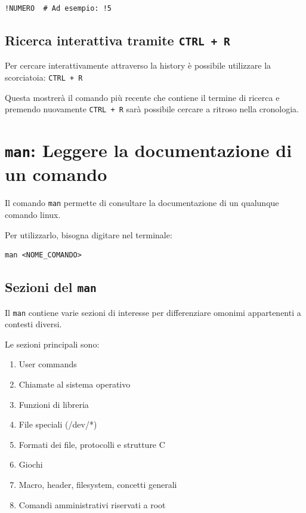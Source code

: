 \documentclass[a4paper]{report}
\newenvironment{code}{\begin{tcolorbox}[size=small]}{\end{tcolorbox}}
\begin{document}
\begin{lstlisting}
!NUMERO  # Ad esempio: !5
\end{lstlisting}

\subsection*{Ricerca interattiva tramite \texttt{CTRL + R}}
Per cercare interattivamente attraverso la history è possibile utilizzare la scorciatoia: \texttt{CTRL + R}

Questa mostrerà il comando più recente che contiene il termine di ricerca e premendo nuovamente \texttt{CTRL + R} sarà possibile cercare a ritroso nella cronologia.

\section{\texttt{man}: Leggere la documentazione di un comando}

Il comando \texttt{man} permette di consultare la documentazione di un qualunque comando linux.

Per utilizzarlo, bisogna digitare nel terminale:

\begin{code}
\begin{lstlisting}
man <NOME_COMANDO>
\end{lstlisting}
\end{code}

\subsection*{Sezioni del \texttt{man}}

Il \texttt{man} contiene varie sezioni di interesse per differenziare omonimi appartenenti a contesti diversi.

Le sezioni principali sono:

\begin{enumerate}
	\setlength{\itemsep}{0pt}
	\item User commands
	\item Chiamate al sistema operativo
	\item Funzioni di libreria
	\item File speciali (/dev/*)
	\item Formati dei file, protocolli e strutture C
	\item Giochi
	\item Macro, header, filesystem, concetti generali
	\item Comandi amministrativi riservati a root
\end{enumerate}
\end{document}
